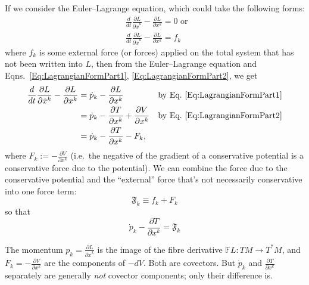 If we consider the Euler--Lagrange equation, which could take the following
forms:
\[
\begin{aligned}
& \frac{d}{dt} \frac{\partial L }{ \partial \dot{x}^k}
  - \frac{\partial L }{ \partial x^k} = 0 \text{ or } \\
& \frac{d}{dt} \frac{\partial L }{ \partial \dot{x}^k}
  - \frac{\partial L }{ \partial x^k} = f_k
\end{aligned}
\]
where $f_k$ is some external force (or forces) applied on the total system
that has not been written into $L$, then from the Euler--Lagrange equation
and Eqns.~\ref{Eq:LagrangianFormPart1}, \ref{Eq:LagrangianFormPart2}, we get
\[
\begin{aligned}
 \frac{d}{dt}\frac{\partial L}{\partial\dot x^k}
   -\frac{\partial L}{\partial x^k}
 &=\dot p_k-\frac{\partial L}{\partial x^k}
 &&\text{by Eq.~\ref{Eq:LagrangianFormPart1}}\\
 &=\dot p_k-\frac{\partial T}{\partial x^k}
   +\frac{\partial V}{\partial x^k}
 &&\text{by Eq.~\ref{Eq:LagrangianFormPart2}}\\
 &=\dot p_k-\frac{\partial T}{\partial x^k}-F_k ,
\end{aligned}
\]
where $F_k := -\frac{\partial V}{\partial x^k}$ (i.e.\ the negative of the
gradient of a conservative potential is a conservative force due to the
potential). We can combine the force due to the conservative potential and
the ``external'' force that's not necessarily conservative into one force
term:
\[
\mathfrak{F}_k \equiv f_k + F_k
\]
so that
\begin{equation}\label{Eq:EulerLagrangeEquationForm2}
	\dot{p}_k - \frac{\partial T}{ \partial x^k} = \mathfrak{F}_k
\end{equation}

The momentum $p_k=\frac{\partial L}{\partial\dot x^k}$ is the image of the
fibre derivative $\mathbb FL:TM\to T^*M$, and
$F_k=-\frac{\partial V}{\partial x^k}$ are the components of $-dV$. Both are
covectors. But $\dot p_k$ and $\frac{\partial T}{\partial x^k}$ separately are
generally \emph{not} covector components; only their difference is.

